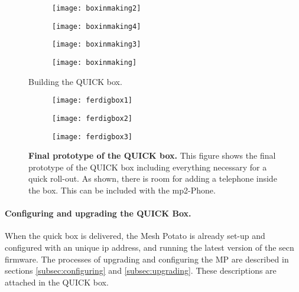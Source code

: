 \begin{figure}
        \centering
        \begin{subfigure}[t]{0.4\textwidth}
                \texttt{[image: boxinmaking2]}
                \label{fig:boxinmaking2}
        \end{subfigure}
        \begin{subfigure}[t]{0.4\textwidth}
                \texttt{[image: boxinmaking4]}
                \label{fig:boxinmaking}
        \end{subfigure}
         \begin{subfigure}[t]{0.3\textwidth}
                \texttt{[image: boxinmaking3]} 
                \label{fig:boxinmaking3}
        \end{subfigure}
        \begin{subfigure}[t]{0.4\textwidth}
                \texttt{[image: boxinmaking]} 
                \label{fig:boxinmaking4}
        \end{subfigure}
\caption{Building the QUICK box.} \label{fig:boxinmaking}
\end{figure}

\begin{figure}
        \centering
        \begin{subfigure}[t]{0.4\textwidth}
                \texttt{[image: ferdigbox1]}
                \label{fig:ferdigbox1}
        \end{subfigure}
        \begin{subfigure}[t]{0.4\textwidth}
                \texttt{[image: ferdigbox2]}
                \label{fig:ferdigbox2}
        \end{subfigure}
         \begin{subfigure}[t]{0.81\textwidth}
                \texttt{[image: ferdigbox3]} 
                \label{fig:ferdigbox3}
        \end{subfigure}
\caption[Final prototype of the QUICK box]{\textbf{Final prototype of the QUICK box.} This figure shows the final prototype of the QUICK box including everything necessary for a quick roll-out. As shown, there is room for adding a telephone inside the box. This can be included with the \gls{mp2}-Phone.} \label{fig:ferdigbox}
\end{figure}


\paragraph{Configuring and upgrading the QUICK Box.}
When the \gls{quick} box is delivered, the Mesh Potato is already set-up and configured with an unique \gls{ip} address, and running the latest version of the \gls{secn} firmware. The processes of upgrading and configuring the MP are described in sections \ref{subsec:configuring} and \ref{subsec:upgrading}. These descriptions are attached in the QUICK box.

